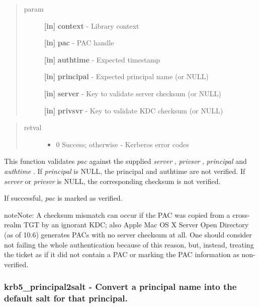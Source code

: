 \documentclass[letterpaper,10pt,english]{sphinxmanual}
\begin{document}
\begin{quote}\begin{description}
\item[{param}] \leavevmode
\textbf{{[}in{]}} \textbf{context} - Library context

\textbf{{[}in{]}} \textbf{pac} - PAC handle

\textbf{{[}in{]}} \textbf{authtime} - Expected timestamp

\textbf{{[}in{]}} \textbf{principal} - Expected principal name (or NULL)

\textbf{{[}in{]}} \textbf{server} - Key to validate server checksum (or NULL)

\textbf{{[}in{]}} \textbf{privsvr} - Key to validate KDC checksum (or NULL)

\end{description}\end{quote}
\begin{quote}\begin{description}
\item[{retval}] \leavevmode\begin{itemize}
\item {} 
0   Success; otherwise - Kerberos error codes

\end{itemize}

\end{description}\end{quote}

This function validates \emph{pac} against the supplied \emph{server} , \emph{privsvr} , \emph{principal} and \emph{authtime} . If \emph{principal} is NULL, the principal and authtime are not verified. If \emph{server} or \emph{privsvr} is NULL, the corresponding checksum is not verified.

If successful, \emph{pac} is marked as verified.

\begin{notice}{note}{Note:}
A checksum mismatch can occur if the PAC was copied from a cross-realm TGT by an ignorant KDC; also Apple Mac OS X Server Open Directory (as of 10.6) generates PACs with no server checksum at all. One should consider not failing the whole authentication because of this reason, but, instead, treating the ticket as if it did not contain a PAC or marking the PAC information as non-verified.
\end{notice}


\subsubsection{krb5\_principal2salt -  Convert a principal name into the default salt for that principal.}
\label{appdev/refs/api/krb5_principal2salt:krb5-principal2salt-convert-a-principal-name-into-the-default-salt-for-that-principal}\label{appdev/refs/api/krb5_principal2salt::doc}
\end{document}
